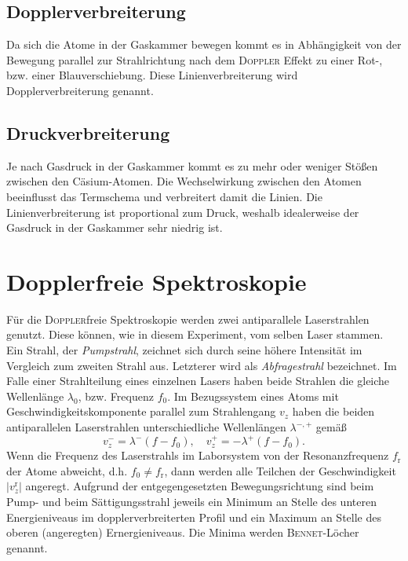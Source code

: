 \documentclass[../bericht.tex]{subfiles}
\begin{document}
      \subsection{Dopplerverbreiterung}
      \label{subsec:dopplerverbreiterung}

        Da sich die Atome in der Gaskammer bewegen kommt es in Abhängigkeit von der Bewegung parallel zur Strahlrichtung nach dem \textsc{Doppler} Effekt zu einer Rot-, bzw. einer Blauverschiebung. Diese Linienverbreiterung wird Dopplerverbreiterung genannt.


      \subsection{Druckverbreiterung}
      \label{subsec:druckverbreiterung}

        Je nach Gasdruck in der Gaskammer kommt es zu mehr oder weniger Stö{\ss}en zwischen den Cäsium-Atomen. Die Wechselwirkung zwischen den Atomen beeinflusst das Termschema und verbreitert damit die Linien. Die Linienverbreiterung ist proportional zum Druck, weshalb idealerweise der Gasdruck in der Gaskammer sehr niedrig ist.


    \section{Dopplerfreie Spektroskopie}

      Für die \textsc{Doppler}freie Spektroskopie werden zwei antiparallele Laserstrahlen genutzt. Diese können, wie in diesem Experiment, vom selben Laser stammen. Ein Strahl, der \textit{Pumpstrahl}, zeichnet sich durch seine höhere Intensität im Vergleich zum zweiten Strahl aus. Letzterer wird als \textit{Abfragestrahl} bezeichnet.
      Im Falle einer Strahlteilung eines einzelnen Lasers haben beide Strahlen die gleiche Wellenlänge $\lambda_0$, bzw. Frequenz $f_0$. Im Bezugssystem eines Atoms mit Geschwindigkeitskomponente parallel zum Strahlengang $v_z$ haben die beiden antiparallelen Laserstrahlen unterschiedliche Wellenlängen $\lambda ^{-,+}$ gemä\ss
      \begin{equation*}
        v_z^-=\lambda^- (f-f_0),\quad v_z^+=-\lambda^+ (f-f_0).
      \end{equation*}
      \medskip
      Wenn die Frequenz des Laserstrahls im Laborsystem von der Resonanzfrequenz $f_\mathrm{r}$ der Atome abweicht, d.h. $f_0\ne f_\mathrm{r}$, dann werden alle Teilchen der Geschwindigkeit $|v_z^\mathrm{r}|$ angeregt. Aufgrund der entgegengesetzten Bewegungsrichtung sind beim Pump- und beim Sättigungsstrahl jeweils ein Minimum an Stelle des unteren Energieniveaus im dopplerverbreiterten Profil und ein Maximum an Stelle des oberen (angeregten) Ernergieniveaus. Die Minima werden \textsc{Bennet}-Löcher genannt.
      \medskip
\end{document}
